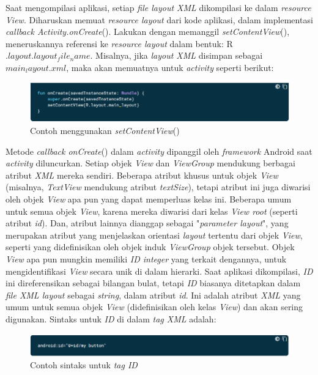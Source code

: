 Saat mengompilasi aplikasi, setiap \textit{file layout XML} dikompilasi ke dalam \textit{resource View}. Diharuskan memuat \textit{resource layout} dari kode aplikasi, dalam implementasi \textit{callback Activity.onCreate}(). Lakukan dengan memanggil \textit{setContentView}(), meneruskannya referensi ke \textit{resource layout} dalam bentuk: R\textit{$.layout.layout_file_name$}. Misalnya, jika \textit{layout XML} disimpan sebagai \textit{$main_layout.xml$}, maka akan memuatnya untuk \textit{activity} seperti berikut:
\begin{figure}[H]
	\centering
	\includegraphics[keepaspectratio, width=12cm]{gambar/layout_setcontentview}
	\caption{Contoh menggunakan \textit{setContentView}() \citep{developerandroid}}
	\label{gambar:gambar_44}
\end{figure}
Metode \textit{callback onCreate}() dalam \textit{activity} dipanggil oleh \textit{framework} Android saat \textit{activity} diluncurkan.
Setiap objek \textit{View} dan \textit{ViewGroup} mendukung berbagai atribut \textit{XML} mereka sendiri. Beberapa atribut khusus untuk objek \textit{View} (misalnya, \textit{TextView} mendukung atribut \textit{textSize}), tetapi atribut ini juga diwarisi oleh objek \textit{View} apa pun yang dapat memperluas kelas ini. Beberapa umum untuk semua objek \textit{View}, karena mereka diwarisi dari kelas \textit{View root} (seperti atribut \textit{id}). Dan, atribut lainnya dianggap sebagai "\textit{parameter layout}", yang merupakan atribut yang menjelaskan orientasi \textit{layout} tertentu dari objek \textit{View}, seperti yang didefinisikan oleh objek induk \textit{ViewGroup} objek tersebut.
Objek \textit{View} apa pun mungkin memiliki \textit{ID integer} yang terkait dengannya, untuk mengidentifikasi \textit{View} secara unik di dalam hierarki. Saat aplikasi dikompilasi, \textit{ID} ini direferensikan sebagai bilangan bulat, tetapi \textit{ID} biasanya ditetapkan dalam \textit{file XML layout} sebagai \textit{string}, dalam atribut \textit{id}. Ini adalah atribut \textit{XML} yang umum untuk semua objek \textit{View} (didefinisikan oleh kelas \textit{View}) dan akan sering digunakan. Sintaks untuk \textit{ID} di dalam \textit{tag XML} adalah:
\begin{figure}[H]
	\centering
	\includegraphics[keepaspectratio, width=12cm]{gambar/layout_tagidbutton}
	\caption{Contoh sintaks untuk \textit{tag ID} \citep{developerandroid}}
	\label{gambar:gambar_45}
\end{figure}
